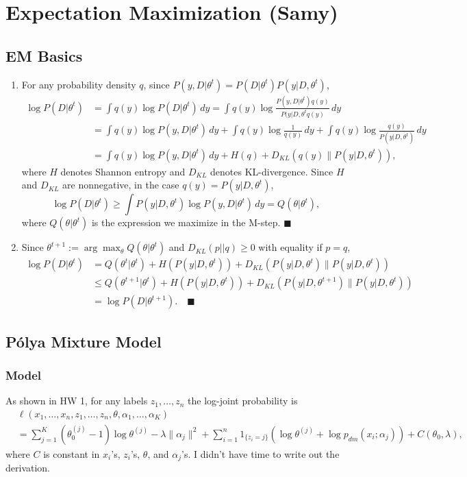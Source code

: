 \documentclass[11pt]{article}
\renewcommand{\qed}{\quad \ensuremath{\blacksquare}}
\begin{document}
\section{Expectation Maximization (Samy)}
\subsection{EM Basics}
\begin{enumerate}
\item For any probability density $q$, since $P(y,D | \theta^t) = P(D | \theta^t)P(y | D,\theta^t)$,
\begin{align*}
\log P(D | \theta^t)
 &  = \int q(y) \log P(D | \theta^t) \, dy
    = \int q(y) \log \frac{P(y,D | \theta^t)q(y)}{P(y | D,\theta^tq(y)} \, dy\\
 &  = \int q(y) \log P(y,D | \theta^t) \, dy
    + \int q(y) \log \frac1{q(y)} \, dy
    + \int q(y) \log \frac{q(y)}{P(y | D,\theta^t)} \, dy\\
 &  = \int q(y) \log P(y,D | \theta^t) \, dy + H(q) + D_{KL}(q(y) \| P(y | D,\theta^t)),
\end{align*}
where $H$ denotes Shannon entropy and $D_{KL}$ denotes KL-divergence. Since $H$
and $D_{KL}$ are nonnegative, in the case $q(y) = P(y | D,\theta^t)$,
\[\log P(D | \theta^t)
    \geq \int P(y | D,\theta^t) \log P(y,D | \theta^t) \, dy
    = Q(\theta | \theta^t),
\]
where $Q(\theta | \theta^t)$ is the expression we maximize in the M-step. \qed
\item Since $\theta^{t + 1} := \arg\!\max_{\theta} Q(\theta | \theta^t)$ and
$D_{KL}(p || q) \geq 0$ with equality if $p = q$,
\begin{align*}
\log P(D | \theta^t)
 &  = Q(\theta^t | \theta^t) + H(P(y | D,\theta^t)) + D_{KL}(P(y | D,\theta^t) \| P(y | D,\theta^t)) \\
 &  \leq Q(\theta^{t + 1} | \theta^t) + H(P(y | D,\theta^t)) + D_{KL}(P(y | D,\theta^{t + 1}) \| P(y | D,\theta^t)) \\
 &  = \log P(D | \theta^{t + 1}). \qed
\end{align*}
\end{enumerate}

\subsection{P\'olya Mixture Model}
\subsubsection{Model}
As shown in HW 1, for any labels $z_1,\dots,z_n$ the log-joint probability is
\begin{align*}
 & \ell(x_1,\dots,x_n,z_1,\dots,z_n,\theta,\alpha_1,\dots,\alpha_K) \\
 &  = \sum_{j = 1}^K (\theta_0^{(j)} - 1)\log\theta^{(j)}
                        - \lambda\|\alpha_j\|^2
    + \sum_{i = 1}^n 1_{\{z_i = j\}}
                \left( \log\theta^{(j)} + \log p_{dm}(x_i; \alpha_j) \right)
    + C(\theta_0,\lambda),
\end{align*}
where $C$ is constant in $x_i$'s, $z_i$'s, $\theta$, and $\alpha_j$'s. I didn't
have time to write out the derivation.
\end{document}
